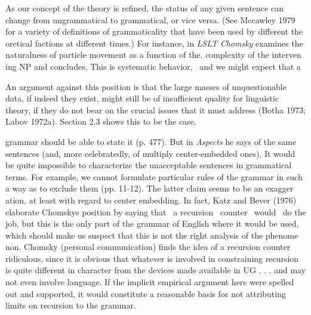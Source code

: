 \begin{styleStandard}
As our concept of the theory is refined, the status of any given sentence can change from ungrammatical to grammatical, or vice versa. (See Mccawley 1979 for a variety of definitions of grammaticality that have been used by different the\- oretical factions at different times.) For instance, in \textit{LSLT}\textit{ }\textit{Chomsk}\textit{y}\textit{ }examines the naturalness of particle movement as a function of the. complexity of the interven\- ing NP and concludes, {\textquotedbl}This is systematic behavior, \ and we might expect that a
\end{styleStandard}


\setcounter{listWWNumlxiiileveli}{12}
\begin{listWWNumlxiiileveli}
\item 
\begin{styleStandard}
An argument against this position is that the large masses of unquestionable data, if indeed they exist, might still be of insufficient quality for linguistic theory, if they do not bear on the crucial issues that it must address (Botha 1973; Labov 1972a). Section 2.3 shows this to be the case.
\end{styleStandard}


\end{listWWNumlxiiileveli}
\clearpage\setcounter{page}{1}\begin{styleStandard}
grammar should be able to state it{\textquotedbl} (p. 477). But in \textit{Aspects}\textit{ }he says of the same sentences (and, more celebratedly, of multiply center-embedded ones), {\textquotedbl}It would be quite impossible to characterize the unacceptable sentences in grammatical terms. For example, we cannot formulate particular rules of the grammar in such a way as to exclude them{\textquotedbl} (pp. 11-12). The latter claim seems to be an exagger\- ation, at least with regard to center embedding. In fact, Katz and Bever (1976) elaborate Chomsky{\textquotesingle}s position by saying that \ a recursion \ counter \ would \ do the job, but this is the only part of the grammar of English where it would be used, which should make us suspect that this is not the right analysis of the phenome\- non. Chomsky (personal communication) finds the idea of a recursion counter {\textquotedbl}ridiculous, since it is obvious that whatever is involved in constraining recursion is quite different in character from the devices made available in UG . . . and may not even involve language.{\textquotedbl} If the implicit empirical argument here were spelled out and supported, it would constitute a reasonable basis for not attributing limits on recursion to the grammar.
\end{styleStandard}


